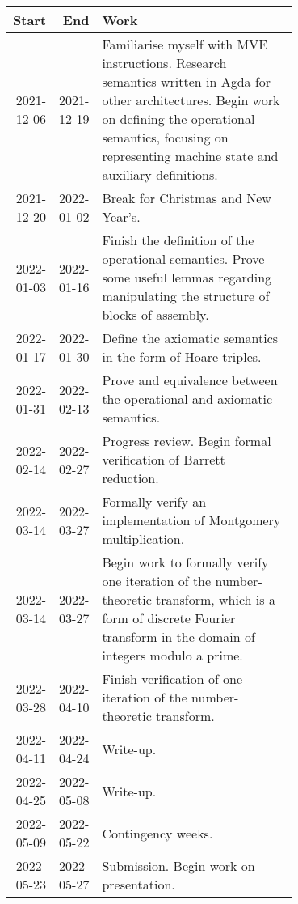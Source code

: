 \documentclass[11pt]{article}
\begin{document}
\begin{center}
\begin{tabular}{rrp{0.7\linewidth}}
Start & End & Work\\
\hline
2021-12-06 & 2021-12-19 & Familiarise myself with MVE instructions. Research semantics written in Agda for other architectures. Begin work on defining the operational semantics, focusing on representing machine state and auxiliary definitions.\\
2021-12-20 & 2022-01-02 & Break for Christmas and New Year's.\\
2022-01-03 & 2022-01-16 & Finish the definition of the operational semantics. Prove some useful lemmas regarding manipulating the structure of blocks of assembly.\\
2022-01-17 & 2022-01-30 & Define the axiomatic semantics in the form of Hoare triples.\\
2022-01-31 & 2022-02-13 & Prove and equivalence between the operational and axiomatic semantics.\\
2022-02-14 & 2022-02-27 & Progress review. Begin formal verification of Barrett reduction.\\
2022-03-14 & 2022-03-27 & Formally verify an implementation of Montgomery multiplication.\\
2022-03-14 & 2022-03-27 & Begin work to formally verify one iteration of the number-theoretic transform, which is a form of discrete Fourier transform in the domain of integers modulo a prime.\\
2022-03-28 & 2022-04-10 & Finish verification of one iteration of the number-theoretic transform.\\
2022-04-11 & 2022-04-24 & Write-up.\\
2022-04-25 & 2022-05-08 & Write-up.\\
2022-05-09 & 2022-05-22 & Contingency weeks.\\
2022-05-23 & 2022-05-27 & Submission. Begin work on presentation.\\
\end{tabular}

\end{center}

\newpage
\appendix
\printbibliography{}
\end{document}
